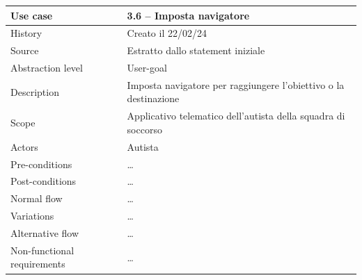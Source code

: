 \documentclass{article}
\begin{document}
    \begin{table}
        \begin{tabularx}{\textwidth}{l|X}
            Use case & \textbf{3.6 – Imposta navigatore}\\
            \hline
            History & Creato il 22/02/24\\
            Source & Estratto dallo statement iniziale\\
            Abstraction level & User-goal\\
            Description & Imposta navigatore per raggiungere l'obiettivo o la destinazione\\
            Scope & Applicativo telematico dell'autista della squadra di soccorso\\
            Actors & Autista\\
            Pre-conditions & \dots \\
            Post-conditions & \dots \\
            Normal flow & \dots\\
            Variations & \dots \\
            Alternative flow & \dots \\
            Non-functional requirements & \dots
        \end{tabularx}
        \label{tab:usecase3.6}
    \end{table}
\end{document}
